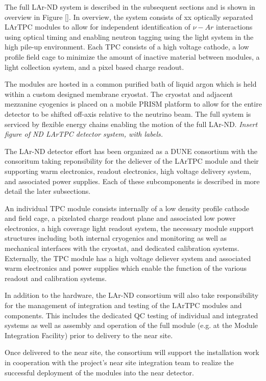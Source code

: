 The full LAr-ND system is described in the subsequent sections and is shown in overview in Figure \ref{}. In overview, the system consists of xx optically separated LArTPC modules to allow for independent identification of $\nu-Ar$ interactions using optical timing and enabling neutron tagging using the light system in the high pile-up environment. Each TPC consists of a high voltage cathode, a low profile field cage to minimize the amount of inactive material between modules, a light collection system, and a pixel based charge readout. 

The modules are hosted in a common purified bath of liquid argon which is held within a custom designed membrane cryostat. The cryostat and adjacent mezzanine cyogenics is placed on a mobile PRISM platform to allow for the entire detector to be shifted off-axis relative to the neutrino beam. The full system is serviced by flexible energy chains enabling the motion of the full LAr-ND.
{\it Insert figure of ND LArTPC detector system, with labels.}

The LAr-ND detector effort has been organized as a DUNE consortium with the consoritum taking reponsibility for the deliever of the LArTPC module and their supporting warm electronics, readout electronics, high voltage delivery system, and associated power supplies. Each of these subcomponents is described in more detail the later subsections. 

An individual TPC module consists internally of a low density profile cathode and field cage, a pixelated charge readout plane and associated low power electronics, a high coverage light readout system, the necessary module support structures including both internal cryogenics and monitoring as well as mechanical interfaces with the cryostat, and dedicated calibration systems. Externally, the TPC module has a high voltage deliever system and associated warm electronics and power supplies which enable the function of the various readout and calibration systems. 

In addition to the hardware, the LAr-ND consortium will also take responsibility for the management of integration and testing of the LArTPC modules and components. This includes the dedicated QC testing of individual and integrated systems as well as assembly and operation of the full module (e.g. at the Module Integration Facility) prior to delivery to the near site.

Once delivered to the near site, the consortium will support the installation work in cooperation with the project's near site integration team to realize the successful deployment of the modules into the near detector.

